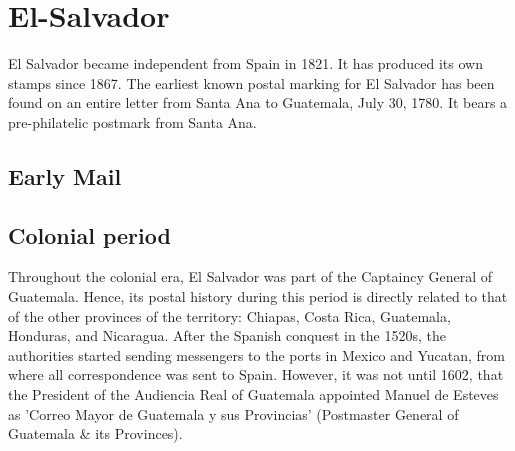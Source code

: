 
\section{El-Salvador} 
El Salvador became independent from Spain in 1821. It has produced its own stamps since 1867.
The earliest known postal marking for El Salvador has been found on an entire letter from Santa Ana to Guatemala, July 30, 1780. It bears a pre-philatelic postmark from Santa Ana.

\subsection{Early Mail}


\subsection{Colonial period}

Throughout the colonial era, El Salvador was part of the Captaincy General of Guatemala. Hence, its postal history during this period is directly related to that of the other provinces of the territory: Chiapas, Costa Rica, Guatemala, Honduras, and Nicaragua. After the Spanish conquest in the 1520s, the authorities started sending messengers to the ports in Mexico and Yucatan, from where all correspondence was sent to Spain. However, it was not until 1602, that the President of the Audiencia Real of Guatemala appointed Manuel de Esteves as 'Correo Mayor de Guatemala y sus Provincias' (Postmaster General of Guatemala \& its Provinces).

